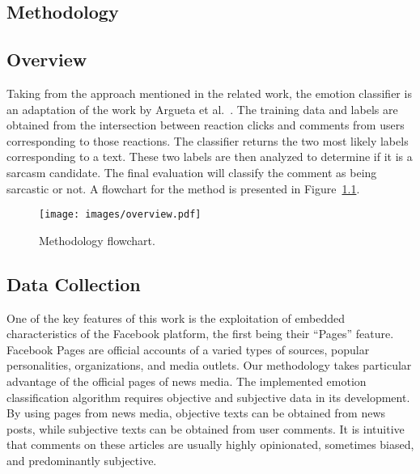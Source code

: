 \documentclass[12pt,a4paper]{report}
\theoremstyle{definition}
\begin{document}
\begin{CJK}{UTF8}{bsmi}
    
 \chapter{Methodology}
    \section{Overview}
    Taking from the approach mentioned in the related work, the emotion classifier is an adaptation of the work by Argueta et al.~\cite{argueta2016multilingual}. The training data and labels are obtained from the intersection between reaction clicks and comments from users corresponding to those reactions. The classifier returns the two most likely labels corresponding to a text. These two labels are then analyzed to determine if it is a sarcasm candidate. The final evaluation will classify the comment as being sarcastic or not. A flowchart for the method is presented in Figure~\ref{fig:flowchart}.
    \begin{figure}[H]
        \centering
        \texttt{[image: images/overview.pdf]}
        \caption{Methodology flowchart.}
        \label{fig:flowchart}
    \end{figure}
    \section{Data Collection}
    \par One of the key features of this work is the exploitation of embedded characteristics of the Facebook platform, the first being their “Pages” feature. Facebook Pages are official accounts of a varied types of sources, popular personalities, organizations, and media outlets. Our methodology takes particular advantage of the official pages of news media. The implemented emotion classification algorithm requires objective and subjective data in its development. By using pages from news media, objective texts can be obtained from news posts, while subjective texts can be obtained from user comments. It is intuitive that comments on these articles are usually highly opinionated, sometimes biased, and predominantly subjective.
    

\end{CJK}
\end{document}
